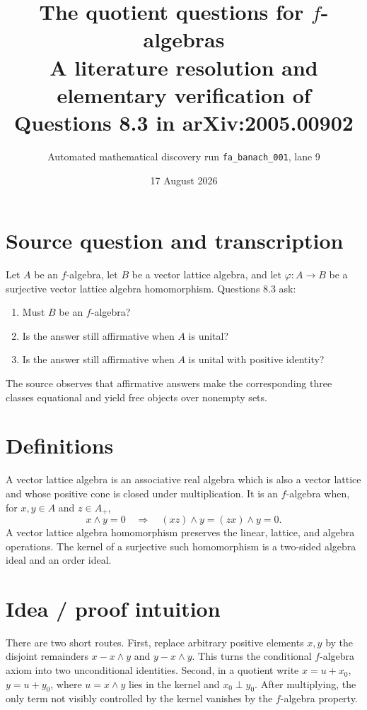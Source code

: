 \documentclass[11pt]{article}
\title{The quotient questions for \(f\)-algebras\\
\large A literature resolution and elementary verification of Questions 8.3 in arXiv:2005.00902}
\author{Automated mathematical discovery run \texttt{fa\_banach\_001}, lane 9}
\date{17 August 2026}
\newcommand{\vp}{\varphi}
\newcommand{\meet}{\mathbin{\wedge}}
\begin{document}
\maketitle

\begin{center}
\end{center}

\section*{Source question and transcription}
Let \(A\) be an \(f\)-algebra, let \(B\) be a vector lattice algebra, and
let \(\vp:A\to B\) be a surjective vector lattice algebra homomorphism.
Questions 8.3 ask:
\begin{enumerate}
\item Must \(B\) be an \(f\)-algebra?
\item Is the answer still affirmative when \(A\) is unital?
\item Is the answer still affirmative when \(A\) is unital with positive
identity?
\end{enumerate}
The source observes that affirmative answers make the corresponding three
classes equational and yield free objects over nonempty sets.

\section*{Definitions}
A vector lattice algebra is an associative real algebra which is also a
vector lattice and whose positive cone is closed under multiplication.  It is
an \(f\)-algebra when, for \(x,y\in A\) and \(z\in A_+\),
\[
 x\meet y=0 \quad\Longrightarrow\quad
 (xz)\meet y=(zx)\meet y=0.
\]
A vector lattice algebra homomorphism preserves the linear, lattice, and
algebra operations.  The kernel of a surjective such homomorphism is a
two-sided algebra ideal and an order ideal.

\section*{Idea / proof intuition}
There are two short routes.  First, replace arbitrary positive elements
\(x,y\) by the disjoint remainders \(x-x\meet y\) and \(y-x\meet y\).  This
turns the conditional \(f\)-algebra axiom into two unconditional identities.
Second, in a quotient write \(x=u+x_0\), \(y=u+y_0\), where
\(u=x\meet y\) lies in the kernel and \(x_0\perp y_0\).  After multiplying,
the only term not visibly controlled by the kernel vanishes by the
\(f\)-algebra property.
\end{document}
